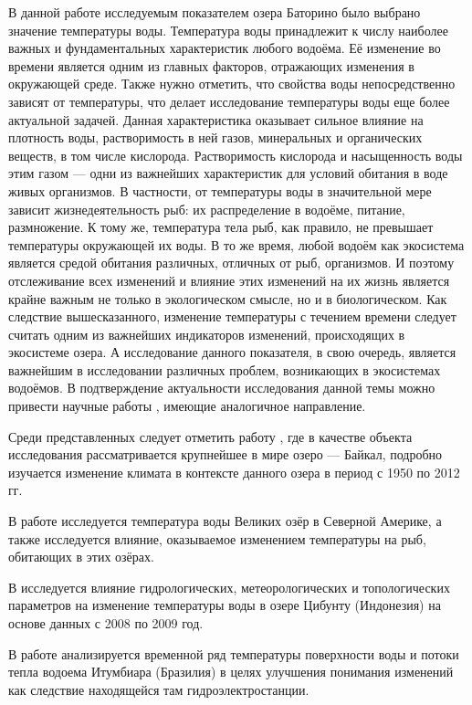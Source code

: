 В данной работе исследуемым показателем озера Баторино было выбрано значение температуры воды. Температура воды принадлежит к числу наиболее важных и фундаментальных характеристик любого водоёма. Её изменение во времени является одним из главных факторов, отражающих изменения в окружающей среде. Также нужно отметить, что свойства воды непосредственно зависят от температуры, что делает исследование температуры воды еще более актуальной задачей. Данная характеристика оказывает сильное влияние на плотность воды, растворимость в ней газов, минеральных и органических веществ, в том числе кислорода. Растворимость кислорода и насыщенность воды этим газом --- одни из важнейших характеристик для условий обитания в воде живых организмов. В частности, от температуры воды в значительной мере зависит жизнедеятельность рыб: их распределение в водоёме, питание, размножение. К тому же, температура тела рыб, как правило, не превышает температуры окружающей их воды. В то же время, любой водоём как экосистема является средой обитания различных, отличных от рыб, организмов. И поэтому отслеживание всех изменений и влияние этих изменений на их жизнь является крайне важным не только в экологическом смысле, но и в биологическом. Как следствие вышесказанного, изменение температуры с течением времени следует считать одним из важнейших индикаторов изменений, происходящих в экосистеме озера. А исследование данного показателя, в свою очередь, является важнейшим в исследовании различных проблем, возникающих в экосистемах водоёмов. В подтверждение актуальности исследования данной темы можно привести научные работы \cite{Katz2011,OBrien2012a,Subehi2011, ALCANTARA2011, Chokshi2006}, имеющие аналогичное направление.

Среди представленных следует отметить работу \cite{Katz2011}, где в качестве объекта исследования рассматривается крупнейшее в мире озеро --- Байкал, подробно изучается изменение климата в контексте данного озера в период с 1950 по 2012 гг.

В работе \cite{OBrien2012a} исследуется температура воды Великих озёр в Северной Америке, а также исследуется влияние, оказываемое изменением температуры на рыб, обитающих в этих озёрах.

В \cite{Subehi2011} исследуется влияние гидрологических, метеорологических и топологических параметров на изменение температуры воды в озере Цибунту (Индонезия) на основе данных с 2008 по 2009 год.

В работе \cite{ALCANTARA2011} анализируется временной ряд температуры поверхности воды и потоки тепла водоема Итумбиара (Бразилия) в целях улучшения понимания изменений как следствие находящейся там гидроэлектростанции.

